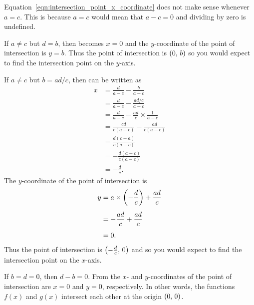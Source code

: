 \documentclass[a4paper,oneside,12pt]{article}
\begin{document}
\begin{problem}
{\begin{solution}
Equation~\eqref{eqn:intersection_point_x_coordinate} does not make
sense whenever $a = c$.  This is because $a = c$ would mean that
$a - c = 0$ and dividing by zero is undefined.

If $a \neq c$ but $d = b$, then
 becomes $x = 0$ and the
$y$-coordinate of the point of intersection is $y = b$.  Thus the
point of intersection is $\tuple{0}{b}$ so you would expect to find
the intersection point on the $y$-axis.

If $a \neq c$ but $b = ad / c$, then
 can be written as
\begin{align*}
x
&=
\frac{d}{a - c} - \frac{b}{a - c} \\[4pt]
&=
\frac{d}{a - c} - \frac{ad / c}{a - c} \\[4pt]
&=
\frac{d}{a - c} - \frac{ad}{c} \times \frac{1}{a - c} \\[4pt]
&=
\frac{cd}{c(a - c)} - \frac{ad}{c(a - c)} \\[4pt]
&=
\frac{d(c - a)}{c(a - c)} \\[4pt]
&=
-\frac{d(a - c)}{c(a - c)} \\[4pt]
&=
-\frac{d}{c}.
\end{align*}
The $y$-coordinate of the point of intersection is
\begin{align*}
y
&=
a \times \parenthesis*{-\frac{d}{c}} + \frac{ad}{c} \\[4pt]
&=
-\frac{ad}{c} + \frac{ad}{c} \\[4pt]
&=
0.
\end{align*}
Thus the point of intersection is $\tuple{-\frac{d}{c}}{0}$ and so you
would expect to find the intersection point on the $x$-axis.

If $b = d = 0$, then $d - b = 0$.
From  the $x$- and
$y$-coordinates of the point of intersection are $x = 0$ and $y = 0$,
respectively.  In other words, the functions $f(x)$ and $g(x)$
intersect each other at the origin $\tuple{0}{0}$.
\end{solution}
}{}

\begin{table}[!htbp]
\centering

\caption{%
  The height of a child between the ages of $10$ and $15$.  Age is
  measured in years and height is measured in metres.
}
\label{tab:children_height_by_age}
\end{table}


\end{problem}
\end{document}

